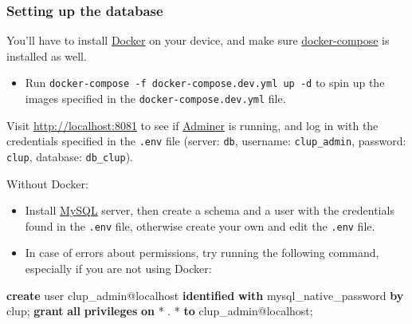 \documentclass[
]{article}
\newenvironment{Shaded}{}{}
\newcommand{\FunctionTok}[1]{\textcolor[rgb]{0.02,0.16,0.49}{#1}}
\newcommand{\KeywordTok}[1]{\textcolor[rgb]{0.00,0.44,0.13}{\textbf{#1}}}
\newcommand{\NormalTok}[1]{#1}
\newcommand{\OperatorTok}[1]{\textcolor[rgb]{0.40,0.40,0.40}{#1}}
\newcommand{\StringTok}[1]{\textcolor[rgb]{0.25,0.44,0.63}{#1}}
\providecommand{\tightlist}{%
  \setlength{\itemsep}{0pt}\setlength{\parskip}{0pt}}
\begin{document}
\hypertarget{setting-up-the-database}{%
\subsubsection{Setting up the database}\label{setting-up-the-database}}

You'll have to install \href{https://www.docker.com/}{Docker} on your
device, and make sure
\href{https://docs.docker.com/compose/install/}{docker-compose} is
installed as well.

\begin{itemize}
\tightlist
\item
  Run \texttt{docker-compose\ -f\ docker-compose.dev.yml\ up\ -d} to spin up the images specified in
  the \texttt{docker-compose.dev.yml} file.
\end{itemize}

Visit \url{http://localhost:8081} to see if
\href{https://www.adminer.org}{Adminer} is running, and log in with the
credentials specified in the \texttt{.env} file (server: \texttt{db},
username: \texttt{clup\_admin}, password: \texttt{clup}, database:
\texttt{db\_clup}).

Without Docker:

\begin{itemize}
\tightlist
\item
  Install \href{https://www.mysql.com}{MySQL} server, then create a
  schema and a user with the credentials found in the \texttt{.env}
  file, otherwise create your own and edit the \texttt{.env} file.
\end{itemize}


\begin{itemize}
\tightlist
\item
  In case of errors about permissions, try running the following
  command, especially if you are not using Docker:
\end{itemize}

\begin{Shaded}
\begin{Highlighting}[]
\KeywordTok{create} \FunctionTok{user}\NormalTok{ clup\_admin@localhost }\KeywordTok{identified} \KeywordTok{with}\NormalTok{ mysql\_native\_password }\KeywordTok{by} \StringTok{\textquotesingle{}clup\textquotesingle{}}\NormalTok{;}
\KeywordTok{grant} \KeywordTok{all} \KeywordTok{privileges} \KeywordTok{on} \OperatorTok{*}\NormalTok{ . }\OperatorTok{*} \KeywordTok{to}\NormalTok{ clup\_admin@localhost;}
\end{Highlighting}
\end{Shaded}
\end{document}
